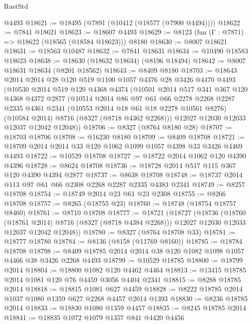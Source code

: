 \begin{lexlean}{RustStd}
\begin{coremodule}
{\begin{coremodule}
{{{{{{{{{{{{{{{{{{{{{{{{{{{{{{{{{{{{{{{{{{{{{{{{{{{{{{    @4493
@18621 := @18495 (@7891 (@10412 (@18577 (@7900 @4494))))
@18622 := @7841 @18621
@18623 := @18607 @4493
@18629 := @8123 (fun (Γ : @7871) => @18622 (@18565 (@18584 @18623))) @8180
@18630 := @8007 @18621
@18631 := @18563 @10487
@18632 := @7841 @18631
@18634 := @10490 @18583 @18623
@18638 := @18630 (@18632 @18634) (@8196 @18494)
@18642 := @8007 @18631 @18634 (@8201 @18562)
@18643 := @8409 @8180
@18703 := @18643
    @2014
    @2014
    @28
    @120
    @519
    @1100
    @1057
    @4376
    @28
    @3426
    @4470
    @4493
    (@10530
      @2014
      @519
      @120
      @4368
      @4374
      (@10501
        @2014
        @517
        @341
        @367
        @120
        @4368
        @4372
        @2877
        (@10514
          @2014
          @86
          @97
          @61
          @66
          @2278
          @2268
          @2287
          @2335
          @4361
          @2341
          (@10553 @2014 @18 @61 @18 @2278 @10561 @8276)
          (@10584 @2014)
          @8716
          (@8327 (@8718 @4362 @2268)))
        @12027
        @12030
        @12033
        @12037
        @12042
        @12048))
@18706 := @8327 (@8764 @8180 @28)
@18707 := @18703 @18706
@18708 := @16230 @8180
@18709 := @8409 @18708
@18721 := @18709 @2014 @2014 @33 @120 @1062 @1099 @1057 @4398 @33 @3426 @4469 @4493
@18722 := @10529 @18708
@18727 := @18722 @2014 @1062 @120 @4390 @4396
@18728 := @8624 @18708
@18736 := @18728 @2014 @517 @115 @367 @120 @4390 @4394 @2877
@18737 := @8638 @18708
@18748 := @18737 @2014 @113 @97 @61 @66 @2308 @2268 @2287 @2335 @4383 @2341
@18749 := @8257 @18708
@18754 := @18749 @2014 @23 @61 @23 @2308
@18755 := @8266 @18708
@18757 := @8265 (@18755 @23)
@18760 := @18748 (@18754 @18757 @8460)
@18761 := @8710 @18708
@18777 := @18721
    (@18727
      (@18736
        (@18760 (@18761 @2014) @8716 (@8327 (@8718 @4384 @2268)))
        @12027
        @12030
        @12033
        @12037
        @12042
        @12048))
@18780 := @8327 (@8764 @18708 @33)
@18781 := @18777 @18780
@18784 := @8136 (@8158 (@11769 @8160))
@18785 := @18784 @18708
@18798 := @8409 @18785 @2014 @2014 @38 @120 @1082 @1098 @1057 @4466 @38 @3426 @2268 @4493
@18799 := @10529 @18785
@18800 := @18799 @2014
@18804 := @18800 @1082 @120 @4462 @4464
@18813 := @13415 @18785 @2014 @1081 @120 @76 @4459 @3056 @4404 @2341
@18815 := @8288 @18785 @2014
@18818 := @18815 @1081 @627 @4459
@18828 := @8222 @18785 @2014 @1037 @1080 @1359 @627 @2268 @4457 @2014 @1393
@18830 := @8236 @18785 @2014
@18833 := @18830 @1080 @1359 @4457
@18835 := @8245 @18785 @2014
@18841 := @18835 @1072 @1079 @1357 @841 @4420 @4456
}}}}}}}}}}}}}}}}}}}}}}}}}}}}}}}}}}}}}}}}}}}}}}}}}}}}}}
\end{coremodule}}
\end{coremodule}
\end{lexlean}
